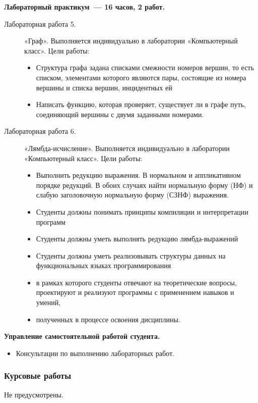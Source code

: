 {\textbf{Лабораторный практикум~— 16 часов, 2 работ.}
\begin{description}
\item[Лабораторная работа 5.] «Граф». Выполняется индивидуально в лаборатории «Компьютерный класс». Цели работы: \begin{itemize}
\item Структура графа задана списками смежности номеров вершин, то есть списком, элементами которого являются пары, состоящие из номера вершины и списка вершин, инцидентных ей\item Написать функцию, которая проверяет, существует ли в графе путь, соединяющий вершины с двумя заданными номерами.
\end{itemize}\item[Лабораторная работа 6.] «Лямбда-исчисление». Выполняется индивидуально в лаборатории «Компьютерный класс». Цели работы: \begin{itemize}
\item Выполнить редукцию выражения. В нормальном и аппликативном порядке редукций. В обоих случаях найти нормальную форму (НФ) и слабую заголовочную нормальную форму (СЗНФ) выражения.\item Студенты должны понимать принципы компиляции и интерпретации программ\item Студенты должны уметь выполнять редукцию лямбда-выражений\item Студенты должны уметь реализовывать структуры данных на функциональных языках программирования\item в рамках которого студенты отвечают на теоретические вопросы, проектируют и реализуют программы с применением навыков и умений,\item полученных в процессе освоения дисциплины.
\end{itemize}
\end{description}

\textbf{Управление самостоятельной работой студента.}
\begin{itemize}
\item Консультации по выполнению лабораторных работ.
\end{itemize}
}



\subsubsection{Курсовые работы}
{\parindent0pt
Не предусмотрены.
}

